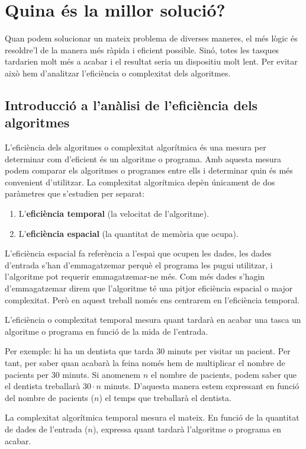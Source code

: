 \section{Quina és la millor solució?}
Quan podem solucionar un mateix problema de diverses maneres, el més lògic és resoldre'l de la manera més ràpida i eficient possible. Sinó, totes les tasques tardarien molt més a acabar i el resultat seria un dispositiu molt lent. Per evitar això hem d'analitzar l'eficiència o complexitat dels algoritmes.

\subsection{Introducció a l'anàlisi de l'eficiència dels algoritmes}%
L'eficiència dels algoritmes o complexitat algorítmica és una mesura per determinar com d'eficient és un algoritme o programa. Amb aquesta mesura podem comparar els algoritmes o programes entre ells i determinar quin és més convenient d'utilitzar. La complexitat algorítmica depèn únicament de dos paràmetres que s'estudien per separat:
\begin{enumerate}
    \item L'\textbf{eficiència temporal} (la velocitat de l'algoritme).
    \item L'\textbf{eficiència espacial} (la quantitat de memòria que ocupa).
\end{enumerate}

L'eficiència espacial fa referència a l'espai que ocupen les dades, les dades d'entrada s'han d'emmagatzemar perquè el programa les pugui utilitzar, i l'algoritme pot requerir emmagatzemar-ne més. Com més dades s'hagin d'emmagatzemar direm que l'algoritme té una pitjor eficiència espacial o major complexitat. Però en aquest treball només ens centrarem en l'eficiència temporal. 

L'eficiència o complexitat temporal mesura quant tardarà en acabar una tasca un algoritme o programa en funció de la mida de l'entrada. 

Per exemple: hi ha un dentista que tarda 30 minuts per visitar un pacient. Per tant, per saber quan acabarà la feina només hem de multiplicar el nombre de pacients per 30 minuts. Si anomenem $n$ el nombre de pacients, podem saber que el dentista treballarà $30 \cdot n$ minuts. D'aquesta manera estem expressant en funció del nombre de pacients ($n$) el temps que treballarà el dentista. 

La complexitat algorítmica temporal mesura el mateix. En funció de la quantitat de dades de l'entrada ($n$), expressa quant tardarà l'algoritme o programa en acabar.

